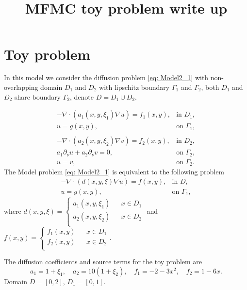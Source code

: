 \documentclass[final,3p,times,11pt]{article}
\title{ \textbf{MFMC toy problem write up}}
\date{}
\begin{document}
\maketitle
\vspace{-2.3cm}

\section{Toy problem}
In this model we consider the diffusion problem \eqref{eq: Model2_1} with non-overlapping domain $D_1$ and  $D_2$ with lipschitz boundary $\Gamma_1$ and $\Gamma_2$, both $D_1$ and $D_2$ share boundary $\Gamma_2$, denote $D = D_1\cup D_2$.

\begin{equation}
\label{eq: Model2_1}
\begin{array}{lll}
-\nabla \cdot (a_1(x,y,\xi_1) \nabla u) = f_1(x,y), & \text{in }D_1,\\
u = g(x,y), & \text{on }\Gamma_1,\\
\\
-\nabla \cdot (a_2(x,y,\xi_2)\nabla v) = f_2(x,y), & \text{in }D_2,\\
a_1\partial_\nu u + a_2\partial_\nu v = 0, & \text{on }\Gamma_2,\\
u=v, & \text{on }\Gamma_2.
\end{array}
\end{equation}
The Model problem \eqref{eq: Model2_1} is equivalent to the following problem
\begin{equation}
\label{eq: Model2_2}
\begin{array}{lll}
-\nabla \cdot (d(x,y,\xi) \nabla u) = f(x,y), & \text{in }D,\\
u = g(x,y), & \text{on }\Gamma_1,
\end{array}
\end{equation}
where $d(x,y,\xi)=\left\{\begin{array}{lll}
a_1(x,y,\xi_1)&& x\in D_1\\
a_2(x,y,\xi_2)&& x\in D_2\\
\end{array}\right.$ and 
$f(x,y)=\left\{\begin{array}{lll}
f_1(x,y)&& x\in D_1\\
f_2(x,y)&& x\in D_2\\
\end{array}\right.$.
\vspace{3mm}

\noindent The diffusion coefficients and source terms for the toy problem are
\[
a_1=1+\xi_1,\quad a_2 = 10(1+\xi_2),\quad f_1 = -2-3x^2,\quad f_2 = 1-6x.
\]
Domain $D=[0,2]$, $D_1=[0,1]$.
\end{document}

